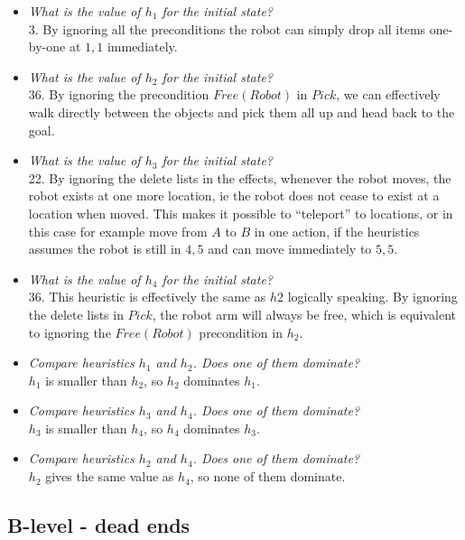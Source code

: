 \documentclass[a4paper, 11pt]{article}
\begin{document}
\begin{itemize}
    \item \textit{What is the value of $h_1$ for the initial state?} \\
    3. By ignoring all the preconditions the robot can simply drop all items one-by-one at $1,1$ immediately.
    \item \textit{What is the value of $h_2$ for the initial state?} \\
    36. By ignoring the precondition $Free(Robot)$ in $Pick$, we can effectively walk directly between the objects and pick them all up and head back to the goal. 
    \item \textit{What is the value of $h_3$ for the initial state?} \\
    22. By ignoring the delete lists in the effects, whenever the robot moves, the robot exists at one more location, ie the robot does not cease to exist at a location when moved. This makes it possible to ``teleport'' to locations, or in this case for example move from $A$ to $B$ in one action, if the heuristics assumes the robot is still in $4,5$ and can move immediately to $5,5$.
    \item \textit{What is the value of $h_4$ for the initial state?} \\
    36. This heuristic is effectively the same as $h2$ logically speaking. By ignoring the delete lists in $Pick$, the robot arm will always be free, which is equivalent to ignoring the $Free(Robot)$ precondition in $h_2$. 
    \item \textit{Compare heuristics $h_1$ and $h_2$. Does one of them dominate?} \\
    $h_1$ is smaller than $h_2$, so $h_2$ dominates $h_1$.
    \item \textit{Compare heuristics $h_3$ and $h_4$. Does one of them dominate?} \\
     $h_3$ is smaller than $h_4$, so $h_4$ dominates $h_3$.
    \item \textit{Compare heuristics $h_2$ and $h_4$. Does one of them dominate?} \\
     $h_2$ gives the same value as $h_4$, so none of them dominate.
\end{itemize}

\subsection{B-level - dead ends}
\end{document}
